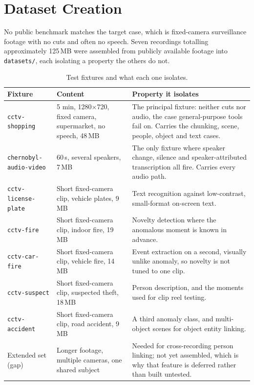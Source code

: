 \documentclass[11pt,a4paper]{article}
\begin{document}
\section{Dataset Creation}

No public benchmark matches the target case, which is fixed-camera surveillance
footage with no cuts and often no speech. Seven recordings totalling
approximately 125\,MB were assembled from publicly available footage into
\texttt{datasets/}, each isolating a property the others do not.

\begin{table}[htbp]
\centering
\small
\begin{tabularx}{\textwidth}{@{}L{2.9cm}L{2.8cm}X@{}}
\toprule
\textbf{Fixture} & \textbf{Content} & \textbf{Property it isolates} \\
\midrule
\texttt{cctv-shopping} & 5 min, 1280$\times$720, fixed camera, supermarket, no speech, 48\,MB & The principal fixture: neither cuts nor audio, the case general-purpose tools fail on. Carries the chunking, scene, people, object and text cases. \\
\texttt{chernobyl-\allowbreak audio-video} & 60\,s, several speakers, 7\,MB & The only fixture where speaker change, silence and speaker-attributed transcription all fire. Carries every audio path. \\
\texttt{cctv-license-plate} & Short fixed-camera clip, vehicle plates, 9\,MB & Text recognition against low-contrast, small-format on-screen text. \\
\texttt{cctv-fire} & Short fixed-camera clip, indoor fire, 19\,MB & Novelty detection where the anomalous moment is known in advance. \\
\texttt{cctv-car-fire} & Short fixed-camera clip, vehicle fire, 14\,MB & Event extraction on a second, visually unlike anomaly, so novelty is not tuned to one clip. \\
\texttt{cctv-suspect} & Short fixed-camera clip, suspected theft, 18\,MB & Person description, and the moments used for clip reel testing. \\
\texttt{cctv-accident} & Short fixed-camera clip, road accident, 9\,MB & A third anomaly class, and multi-object scenes for object entity linking. \\
\addlinespace[2pt]
Extended set (gap) & Longer footage, multiple cameras, one shared subject & Needed for cross-recording person linking; not yet assembled, which is why that feature is deferred rather than built untested. \\
\bottomrule
\end{tabularx}
\caption{Test fixtures and what each one isolates.}
\end{table}
\end{document}
